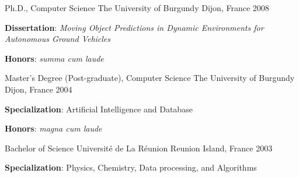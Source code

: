 


\begin{cventries}


\cventry
{Ph.D., Computer Science} %
{The University of Burgundy} %
{Dijon, France} %
{2008} %
{ %
\begin{cvitems}
\item {\textbf{Dissertation}: \emph{Moving Object Predictions in Dynamic Environments for Autonomous Ground Vehicles}}
\item \textbf{Honors}: \textit{summa cum laude}
\end{cvitems}
}
\cventry
{Master's Degree (Post-graduate), Computer Science} %
{The University of Burgundy} %
{Dijon, France} %
{2004} %
{ %
\begin{cvitems}
\item {\textbf{Specialization}: Artificial Intelligence and Database}
\item \textbf{Honors}: \textit{magna cum laude}
\end{cvitems}
}
\cventry
{Bachelor of Science} %
{Universit\'{e} de La R\'{e}union} %
{Reunion Island, France} %
{2003} %
{ %
\begin{cvitems}
\item {\textbf{Specialization}: Physics, Chemistry, Data processing, and  Algorithms}
\end{cvitems}
}
\end{cventries}